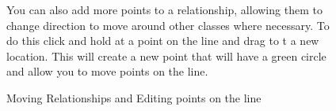 \documentclass[a4paper]{article}
\begin{document}
\begin{figure}[H]
\begin{center}
\end{center}
\vspace{-5pt}
You can also add more points to a relationship, allowing them to change direction to move around other classes where necessary. To do this click and hold at a point on the line and drag to t a new location. This will create a new point that will have a green circle and allow you to move points on the line.
\begin{center}
 \imagespace
{}
\vspace{-5pt}
\caption{Moving Relationships and Editing points on the line}
\end{center}
\end{figure}\vspace{-30pt}
\end{document}
